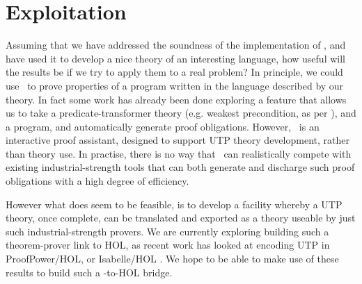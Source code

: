 \section{Exploitation}\label{sec:exploitation}


Assuming that we have addressed the soundness of the implementation of ,
and have used it to develop a nice theory of an interesting language,
how useful will the results be if we try to apply them to a real problem?
In principle, we could use \ to prove properties of a program
written in the language described by our theory.
In fact some work has already been done exploring
a feature that allows us to take a predicate-transformer theory
(e.g. weakest precondition, as per \cite[Chp. 2, p66]{UTP-book}),
and a program,
and automatically generate proof obligations.
However, \ is an interactive proof assistant, designed
to support UTP theory development, rather than theory use.
In practise, there is no way that \ can realistically compete
with existing industrial-strength tools that can both generate
and discharge such proof obligations with a high degree of efficiency.

However what does seem to be feasible, is to develop a facility
whereby a UTP theory, once complete,
can be translated and exported as a theory useable by just such industrial-strength
provers. We are currently exploring building such a theorem-prover link
to
HOL, as recent work has looked at encoding UTP
in ProofPower/HOL\cite{conf/utp/OliveiraCW06,conf/utp/ZC08},
or Isabelle/HOL \cite{conf/utp/FeliachiGW10,conf/vstte/FeliachiGW12}.
We hope to be able to make use of these results
to build such a -to-HOL bridge.
